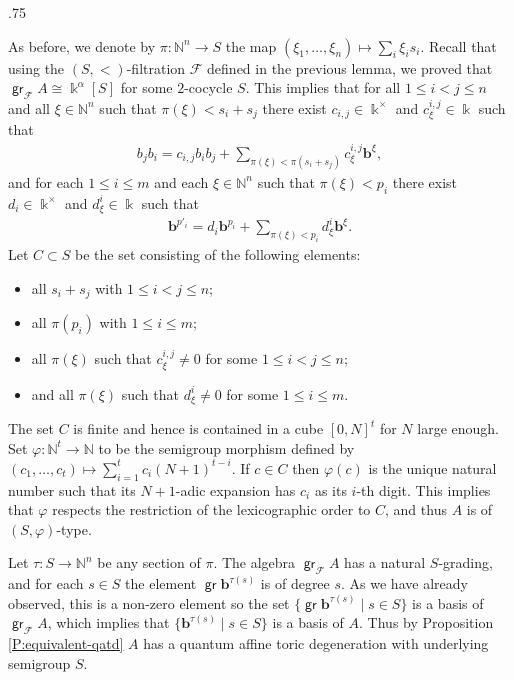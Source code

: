 \documentclass[11pt,fleqn]{article}
\makeatletter
\renewenvironment{proof}[1][\textit{Proof}]{\par
  \pushQED{\qed}%
  \normalfont \topsep.75\paraskip\relax
  \trivlist
  \item[\hskip\labelsep
        \itshape
    #1\@addpunct{.}]\ignorespaces
}{%
  \popQED\endtrivlist\@endpefalse
}
\newcommand\NN{\mathbb N}
\renewcommand\to{\longrightarrow}
\renewcommand\phi{\varphi}
\newcommand\F{\mathcal F}
\renewcommand\b{\mathbf b}
\renewcommand\k{\Bbbk}
\DeclareMathOperator\gr{\mathsf{gr}}
\makeatother
\begin{document}
\begin{proof}
As before, we denote by $\pi: \NN^n \to S$ the map $(\xi_1, \ldots, \xi_n)
\mapsto \sum_i \xi_i s_i$.
Recall that using the $(S,<)$-filtration $\F$ defined in the previous lemma, 
we proved that $\gr_\F A \cong \k^\alpha[S]$ for some $2$-cocycle $S$. This 
implies that for all $1 \leq i < j \leq n$ and all $\xi \in \NN^n$ such that 
$\pi(\xi) < s_i +s_j$ there exist $c_{i,j} \in \k^\times$ and $c^{i,j}_\xi 
\in \k$ such that
\begin{align*}
b_j b_i 
  = c_{i,j} b_i b_j 
    + \sum_{\pi(\xi) < \pi(s_i + s_j)} c^{i,j}_\xi \b^\xi,
\end{align*}
and for each $1 \leq i \leq m$ and each $\xi \in \NN^n$ such that $\pi(\xi) < 
p_i$ there exist $d_i \in \k^\times$ and $d^i_\xi \in \k$ such that
\begin{align*}
  \b^{p'_i} = d_i \b^{p_i} + \sum_{\pi(\xi) < p_i} d^i_\xi \b^\xi.
\end{align*}
Let $C \subset S$ be the set consisting of the following elements:
\begin{itemize}
\item all $s_i + s_j$ with $1 \leq i<j\leq n$;
\item all $\pi(p_i)$ with $1 \leq i \leq m$;
\item all $\pi(\xi)$ such that $c^{i,j}_\xi \neq 0$ for some $1 \leq i < j 
  \leq n$;
\item and all $\pi(\xi)$ such that $d^i_\xi \neq 0$ for some $1 \leq i \leq m$.
\end{itemize}  
The set $C$ is finite and hence is contained in a cube $[0,N]^t$ for $N$ 
large enough. Set $\phi: \NN^t \to \NN$ to be the semigroup morphism defined 
by $(c_1, \ldots, c_t) \mapsto \sum_{i=1}^t c_i (N+1)^{t-i}$. If $c \in C$ 
then $\phi(c)$ is the unique natural number such that its $N+1$-adic expansion
has $c_i$ as its $i$-th digit. This implies that $\phi$ respects the 
restriction of the lexicographic order to $C$, and thus $A$ is of 
$(S,\phi)$-type. 

Let $\tau: S \to \NN^n$ be any section of $\pi$. The algebra $\gr_\F A$ has a 
natural $S$-grading, and for each $s \in S$ the element $\gr \b^{\tau(s)}$ is 
of degree $s$. As we have already observed, this is a non-zero element so the 
set $\{\gr \b^{\tau(s)} \mid s \in S\}$ is a basis of $\gr_\F A$, which 
implies that $\{\b^{\tau(s)} \mid s \in S\}$ is a basis of $A$. Thus by 
Proposition \ref{P:equivalent-qatd} $A$ has a quantum affine toric 
degeneration with underlying semigroup $S$.
\end{proof}
\end{document}
